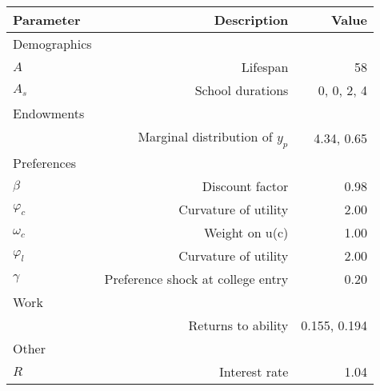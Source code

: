\begin{tabular}{lrr}
\hline
Parameter & Description  & Value  \\ 
\hline
Demographics &   &   \\ 
$A$ & Lifespan  & 58  \\ 
$A_{s}$ & School durations  & 0, 0, 2, 4  \\ 
Endowments &   &   \\ 
 & Marginal distribution of $y_{p}$  & 4.34, 0.65  \\ 
Preferences &   &   \\ 
$\beta$ & Discount factor  & 0.98  \\ 
$\varphi_{c}$ & Curvature of utility  & 2.00  \\ 
$\omega_{c}$ & Weight on u(c)  & 1.00  \\ 
$\varphi_{l}$ & Curvature of utility  & 2.00  \\ 
$\gamma$ & Preference shock at college entry  & 0.20  \\ 
Work &   &   \\ 
 & Returns to ability  & 0.155, 0.194  \\ 
Other &   &   \\ 
$R$ & Interest rate  & 1.04  \\ 
\hline
\end{tabular}%
